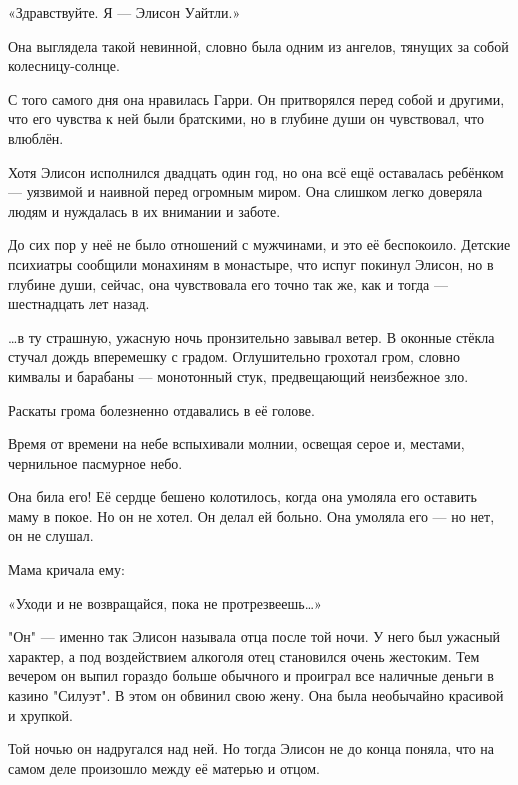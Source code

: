 \documentclass[a4paper,12pt]{book}
\begin{document}
\par
«Здравствуйте. Я — Элисон Уайтли.»\\
\par
Она выглядела такой невинной, словно была одним из ангелов, тянущих за собой колесницу-солнце.
\par
С того самого дня она нравилась Гарри. Он притворялся перед собой и другими, что его чувства к ней были братскими, но в глубине души он чувствовал, что влюблён.\\
\par
Хотя Элисон исполнился двадцать один год, но она всё ещё оставалась ребёнком — уязвимой и наивной перед огромным миром. Она слишком легко доверяла людям и нуждалась в их внимании и заботе.
\par
До сих пор у неё не было отношений с мужчинами, и это её беспокоило. Детские психиатры сообщили монахиням в монастыре, что испуг покинул Элисон, но в глубине души, сейчас, она чувствовала его точно так же, как и тогда — шестнадцать лет назад.\\
\par
…в ту страшную, ужасную ночь пронзительно завывал ветер. В оконные стёкла стучал дождь вперемешку с градом. Оглушительно грохотал гром, словно кимвалы и барабаны — монотонный стук, предвещающий неизбежное зло.\\
\par
Раскаты грома болезненно  отдавались в её голове.\\
\par
Время от времени на небе вспыхивали молнии, освещая серое и, местами, чернильное пасмурное небо.
\par
Она била его! Её сердце бешено колотилось, когда она умоляла его оставить маму в покое. Но он не хотел. Он делал ей больно. Она умоляла его — но нет, он не слушал.
\par
Мама кричала ему:
\par
«Уходи и не возвращайся, пока не протрезвеешь…»\\
\par
"Он" — именно так Элисон называла отца после той ночи. У него был ужасный характер, а под воздействием алкоголя отец становился очень жестоким. Тем вечером он выпил гораздо больше обычного и проиграл все наличные деньги в казино "Силуэт". В этом он обвинил свою жену. Она была необычайно красивой и хрупкой.
\par
Той ночью он надругался над ней. Но тогда Элисон не до конца поняла, что на самом деле произошло между её матерью и отцом.
\par
\end{document}

